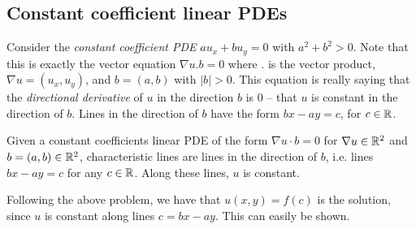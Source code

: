\subsection{Constant coefficient linear PDEs}
Consider the \emph{constant coefficient PDE} $au_x +bu_y=0$ with $a^2+b^2>0$. Note that
this is exactly the vector equation $\nabla u.b=0$ where $.$ is the vector product,
$\nabla u=(u_x,u_y)$, and $b=(a,b)$ with $|b|>0$. This equation is really saying that the
\emph{directional derivative} of $u$ in the direction $b$ is 0 -- that $u$ is constant in
the direction of $b$. Lines in the direction of $b$ have the form $bx-ay=c$, for
$c\in\mathbb R$.
\begin{definition}
  Given a constant coefficients linear PDE of the form $\nabla u\cdot b=0$ for $\nabla
  u\in\mathbb R^2$ and $b=(a,b)\in\mathbb R^2$, characteristic lines are lines in the direction of
  $b$, i.e. lines $bx-ay=c$ for any $c\in\mathbb R$. Along these lines, $u$ is constant.
  \label{def:charLines}
\end{definition}
Following the above problem, we have that $u(x,y)=f(c)$ is the solution, since $u$ is
constant along lines $c=bx-ay$. This can easily be shown.
